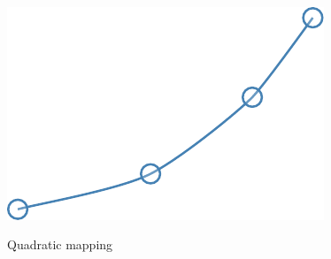 \begin{figure}[H]
		\\[0.5em]
		\includegraphics[]{images/results/terrains/512-1/blending/quadratic_spline.pdf}
		\caption{Quadratic mapping}
		\label{fig:ex-quadratic-surface}
	\end{figure}
	
